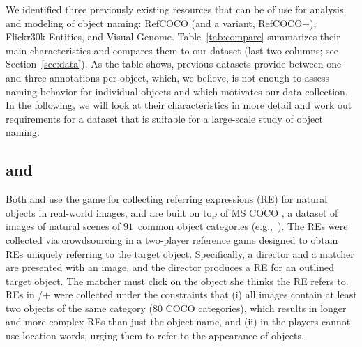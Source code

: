 We identified three previously existing resources that can be of use for analysis and modeling of object naming: RefCOCO (and a variant, RefCOCO+), Flickr30k Entities, and Visual Genome. %
Table~\ref{tab:compare} summarizes their main characteristics and compares them to our dataset (last two columns; see Section~\ref{sec:data}).
As the table shows, previous datasets provide between one and three annotations per object, which, we believe, is not enough to assess naming behavior for individual objects and which
motivates our data collection. %
In the following, we will look at their characteristics in more detail and work out requirements for a dataset that is suitable for a large-scale study of object naming.

\subsection{ and }

Both  and  \cite{Yu2016} use the \cite{Kazemzadeh2014} game for collecting referring expressions (RE) for natural objects in real-world images, and are built on top of MS COCO \cite{mscoco}, 
a dataset of images of natural scenes of $91$~common object categories (e.g.,~). 
The REs were collected via crowdsourcing in a two-player reference game designed to obtain REs uniquely referring to the target object. 
Specifically, a director and a matcher are presented with an image, and the director produces a RE for an outlined target object. 
The matcher must click on the object she thinks the RE refers to. %
REs in /+ were collected under the constraints that (i) all images contain at least two objects of the same category (80 COCO categories), which results in longer and more complex REs than just the object name, and (ii) in  the players cannot use location words, urging them to refer to the appearance of objects.

